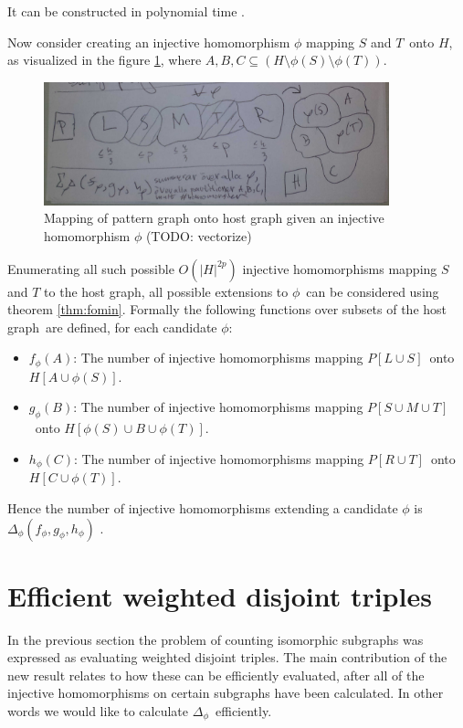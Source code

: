 \documentclass[a4paper,11pt]{report}
\theoremstyle{plain}
\theoremstyle{definition}
\begin{document}
It can be constructed in polynomial time \cite{BHKK13}.

Now consider creating an injective homomorphism $\phi$ mapping $S$ and $T$ onto $H$, as visualized in the figure \ref{fig:homo-viz},
where $A,B,C \subseteq (H \setminus \phi(S) \setminus \phi(T))$.

\begin{figure}[here]
\centering
\includegraphics[width=10cm]{images/sketch_homo.jpg} 
\caption[Mapping]{Mapping of pattern graph onto host graph given an injective homomorphism $\phi$ (TODO: vectorize)}
\label{fig:homo-viz}
\end{figure}

Enumerating all such possible $O(|H|^{2p})$ injective homomorphisms mapping $S$ and $T$ to the host graph,
all possible extensions to $\phi$ can be considered using theorem \ref{thm:fomin}.
Formally the following functions over subsets of the host graph are defined, for each candidate $\phi$:

\begin{itemize}
\item $f_\phi(A)$: The number of injective homomorphisms mapping $P[L \cup S]$ onto $H[A \cup \phi(S)]$.
\item $g_\phi(B)$: The number of injective homomorphisms mapping $P[S \cup M \cup T]$ onto $H[\phi(S) \cup B \cup \phi(T)]$.
\item $h_\phi(C)$: The number of injective homomorphisms mapping $P[R \cup T]$ onto $H[C \cup \phi(T)]$.
\end{itemize}

Hence the number of injective homomorphisms extending a candidate $\phi$ is $\Delta_\phi(f_\phi, g_\phi, h_\phi)$ \cite{BHKK13}.

\section{Efficient weighted disjoint triples}
In the previous section the problem of counting isomorphic subgraphs was expressed as evaluating weighted disjoint triples.
The main contribution of the new result \cite{BHKK13} relates to how these can be efficiently evaluated, after all of the
injective homomorphisms on certain subgraphs have been calculated.
In other words we would like to calculate $\Delta_\phi$ efficiently.
\end{document}
